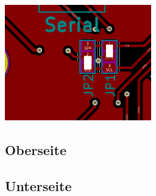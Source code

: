 \documentclass{article}
\begin{document}
\begin{minipage}[t]{\textwidth}
\includegraphics[height=5cm]{image/jumper.png}
\end{minipage}


\subsection{Oberseite}


\subsection{Unterseite}

\end{document}
